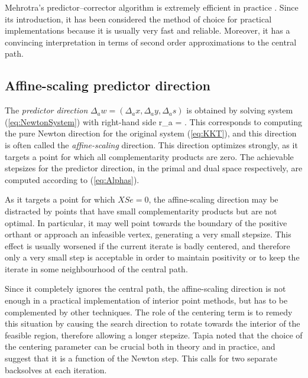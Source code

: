 Mehrotra's predictor--corrector algorithm 
is extremely efficient in practice \cite{LustigMarstenShanno,Mehrotra92}. 
Since its introduction, it has 
been considered the method of choice for practical implementations 
because it is usually very fast and reliable. Moreover, it has a 
convincing interpretation in terms of second order approximations
to the central path.

%
%
\subsection{Affine-scaling predictor direction}

The {\em predictor direction} 
$\Delta_a w = (\Delta_a x, \Delta_a y, \Delta_a s)$ is obtained by solving 
system (\ref{eq:NewtonSystem}) with right-hand side 
\be  \label{eq:PredictorRhs}
 r_a = .
\ee
This corresponds to computing the pure Newton direction for the
original \KKT system (\ref{eq:KKT}), and this direction is often
called the {\em affine-scaling} direction. This 
direction optimizes strongly, as it targets a point for which 
all complementarity products are zero. 
The achievable stepsizes for the predictor direction, 
in the primal and dual space respectively, are computed 
according to (\ref{eq:Alphas}).

As it targets a point for which $XSe = 0$, the affine-scaling direction 
may be distracted by points that have small complementarity products 
but are not optimal. 
In particular, it may well point towards the boundary of the 
positive orthant or approach an infeasible vertex, generating 
a very small stepsize. 
This effect is usually worsened if the current iterate is badly centered, 
and therefore only a very small step is acceptable in order to 
maintain positivity or to keep the iterate in some neighbourhood 
of the central path.

Since it completely ignores the central path, the affine-scaling 
direction is not enough in a practical implementation of 
interior point methods, but has to be 
complemented by other techniques.
The role of the centering term is to remedy this situation by 
causing the search direction to rotate towards the interior 
of the feasible region,
therefore allowing a longer stepsize. 
Tapia \etal \cite{TapiaZhangSaltzmanWeiser} noted that the choice of the 
centering parameter can be crucial both in theory and in practice,
and suggest that it is a function of the Newton step. 
This calls for two separate backsolves at each iteration.

